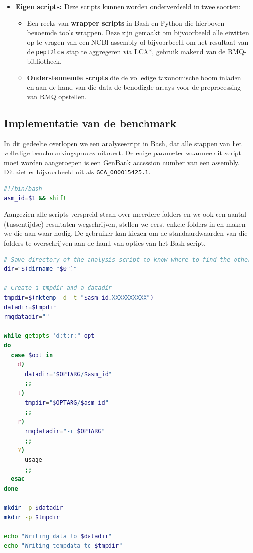 \begin{itemize}
\item \textbf{Eigen scripts:} Deze scripts kunnen worden onderverdeeld in twee 
soorten:

    \begin{itemize}
    
    \item Een reeks van \textbf{wrapper scripts} in Bash en Python die hierboven
    benoemde tools wrappen. Deze zijn gemaakt om bijvoorbeeld alle eiwitten op
    te vragen van een NCBI assembly of bijvoorbeeld om het resultaat van de
    \texttt{pept2lca} stap te aggregeren via LCA*, gebruik makend van de
    RMQ-bibliotheek.
    
    \item \textbf{Ondersteunende scripts} die de volledige taxonomische boom
    inladen en aan de hand van die data de benodigde arrays voor de
    preprocessing van RMQ opstellen.
    \end{itemize}

\end{itemize}

\subsection{Implementatie van de benchmark} 

In dit gedeelte overlopen we een analysescript in Bash, dat alle stappen van het
volledige benchmarkingsproces uitvoert. De enige parameter waarmee dit script
moet worden aangeroepen is een GenBank accession number van een assembly. Dit
ziet er bijvoorbeeld uit als \texttt{GCA\_000015425.1}.
\begin{lstlisting}[language=Bash]
#!/bin/bash
asm_id=$1 && shift
\end{lstlisting}

Aangezien alle scripts verspreid staan over meerdere folders en we ook een
aantal (tussentijdse) resultaten wegschrijven, stellen we eerst enkele folders
in en maken we die aan waar nodig. De gebruiker kan kiezen om de
standaardwaarden van die folders te overschrijven aan de hand van opties van het
Bash script.

\begin{lstlisting}[language=Bash,firstnumber=3]
# Save directory of the analysis script to know where to find the others
dir="$(dirname "$0")"

# Create a tmpdir and a datadir
tmpdir=$(mktemp -d -t "$asm_id.XXXXXXXXXX")
datadir=$tmpdir
rmqdatadir=""

while getopts "d:t:r:" opt
do
  case $opt in
    d)
      datadir="$OPTARG/$asm_id"
      ;;
    t)
      tmpdir="$OPTARG/$asm_id"
      ;;
    r)
      rmqdatadir="-r $OPTARG"
      ;;
    ?)
      usage
      ;;
  esac
done

mkdir -p $datadir
mkdir -p $tmpdir

echo "Writing data to $datadir"
echo "Writing tempdata to $tmpdir"
\end{lstlisting}

